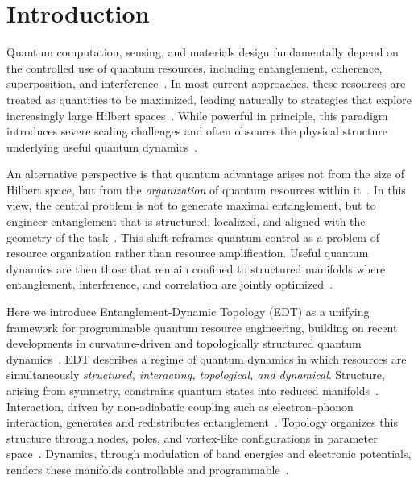﻿\documentclass[aps,prx,reprint,superscriptaddress,longbibliography,floatfix]{revtex4-2}
\begin{document}
\section{Introduction}

Quantum computation, sensing, and materials design fundamentally depend on the controlled use of quantum resources, including entanglement, coherence, superposition, and interference~\cite{NielsenChuang,Horodecki2009,Streltsov2017}. In most current approaches, these resources are treated as quantities to be maximized, leading naturally to strategies that explore increasingly large Hilbert spaces~\cite{Preskill2018,Arute2019}. While powerful in principle, this paradigm introduces severe scaling challenges and often obscures the physical structure underlying useful quantum dynamics~\cite{Eisert2010,Altman2015}.

An alternative perspective is that quantum advantage arises not from the size of Hilbert space, but from the \emph{organization} of quantum resources within it~\cite{Amico2008,Swingle2018}. In this view, the central problem is not to generate maximal entanglement, but to engineer entanglement that is structured, localized, and aligned with the geometry of the task~\cite{Verstraete2008,Orus2014}. This shift reframes quantum control as a problem of resource organization rather than resource amplification. Useful quantum dynamics are then those that remain confined to structured manifolds where entanglement, interference, and correlation are jointly optimized~\cite{KimHuse2013,Choi2016}.

Here we introduce Entanglement-Dynamic Topology (EDT) as a unifying framework for programmable quantum resource engineering, building on recent developments in curvature-driven and topologically structured quantum dynamics~\cite{Hu2024_ACP,Hu2025_APQ,Hu2026_JPCM}. EDT describes a regime of quantum dynamics in which resources are simultaneously \emph{structured, interacting, topological, and dynamical}. Structure, arising from symmetry, constrains quantum states into reduced manifolds~\cite{Wigner1959,Georgi1999}. Interaction, driven by non-adiabatic coupling such as electron--phonon interaction, generates and redistributes entanglement~\cite{Mead1979,Yarkony1996}. Topology organizes this structure through nodes, poles, and vortex-like configurations in parameter space~\cite{Berry1984,Xiao2010}. Dynamics, through modulation of band energies and electronic potentials, renders these manifolds controllable and programmable~\cite{Bukov2015,Eckardt2017}.
\end{document}
